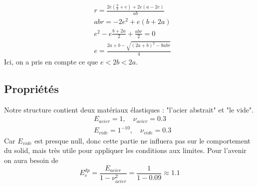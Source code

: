 \documentclass{article}
\begin{document}
\begin{align*}
    & r = \frac{2e(\frac{b}{2} + e) + 2e(a-2e)}{ab} \\
    & abr = -2e^2 + e(b + 2a) \\
    & e^2 - e \frac{b+2a}{2} + \frac{abr}{2} = 0 \\
    & e = \frac{2a + b - \sqrt{(2a+b)^2 - 8abr}}{4}
\end{align*}
Ici, on a pris en compte ce que $e < 2b < 2a$.

\subsection{Propriétés}
Notre structure contient deux matériaux élastiques : "l'acier abstrait" et "le vide". 
\begin{align*}
    & E_{acier} = 1, \quad \nu_{acier} = 0.3 \\
    & E_{vide} = 1^{-10}, \quad \nu_{vide} = 0.3
\end{align*}
Car $E_{vide}$ est presque null, donc cette partie ne influera pas sur le comportement du solid, mais très utile pour appliquer les conditions aux limites.
Pour l'avenir on aura besoin de 
\begin{equation*}
    E_s^{dp} = \frac{E_{acier}}{1-\nu_{acier}^2} = \frac{1}{1-0.09} \approx 1.1
\end{equation*}
\end{document}
